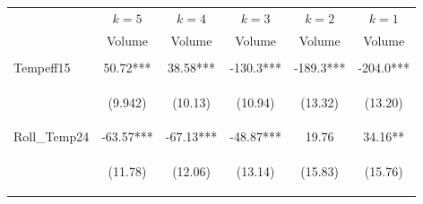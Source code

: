 \begin{center}
\begin{tabular}{lccccc} \toprule
&  $k=5$ & $k=4$ & $k=3$ & $k=2$ & $k=1$ \\
\textcolor{white}{VARIABLES} & Volume & Volume & Volume & Volume & Volume \\ \midrule
\vspace{4pt} & \begin{footnotesize}\end{footnotesize} & \begin{footnotesize}\end{footnotesize} & \begin{footnotesize}\end{footnotesize} & \begin{footnotesize}\end{footnotesize} & \begin{footnotesize}\end{footnotesize} \\
Tempeff15 & 50.72*** & 38.58*** & -130.3*** & -189.3*** & -204.0*** \\
\vspace{4pt} & \begin{footnotesize}(9.942)\end{footnotesize} & \begin{footnotesize}(10.13)\end{footnotesize} & \begin{footnotesize}(10.94)\end{footnotesize} & \begin{footnotesize}(13.32)\end{footnotesize} & \begin{footnotesize}(13.20)\end{footnotesize} \\
Roll\_Temp24 & -63.57*** & -67.13*** & -48.87*** & 19.76 & 34.16** \\
\vspace{4pt} & \begin{footnotesize}(11.78)\end{footnotesize} & \begin{footnotesize}(12.06)\end{footnotesize} & \begin{footnotesize}(13.14)\end{footnotesize} & \begin{footnotesize}(15.83)\end{footnotesize} & \begin{footnotesize}(15.76)\end{footnotesize} \\

\end{tabular}
\end{center}
